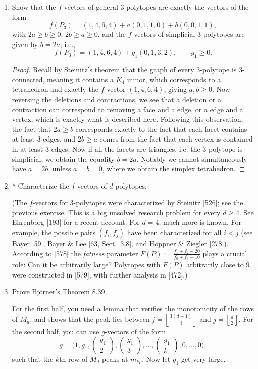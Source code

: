 \documentclass{article}
\begin{document}
\begin{enumerate}
\item Show that the $f$-vectors of general $3$-polytopes are exactly the vectors of the form
\[
f(P_3)=(1,4,6,4)+a(0,1,1,0)+b(0,0,1,1),
\]
with $2a\ge b\ge 0$, $2b\ge a\ge 0$, and the $f$-vectors of simplicial $3$-polytopes are given by $b=2a$, i.e.,
\[
f(P_3)=(1,4,6,4)+g_1(0,1,3,2),\qquad g_1\ge 0.
\]

\begin{proof}
Recall by Steinitz's theorem that the graph of every $3$-polytope is $3$-connected, meaning it contains a $K_4$ minor, which corresponds to a tetrahedron and exactly the $f$-vector $(1,4,6,4)$, giving $a,b \geq 0$. Now reversing the deletions and contractions, we see that a deletion or a contraction can correspond to removing a face and a edge, or a edge and a vertex, which is exactly what is described here. Following this observation, the fact that $2a \geq b$ corresponds exactly to the fact that each facet contains at least $3$ edges, and $2b \geq a$ comes from the fact that each vertex is contained in at least $3$ edges. Now if all the facets are triangles, i.e. the 3-polytope is simplicial, we obtain the equality $b=2a$. Notably we cannot simultaneously have $a=2b$, unless $a=b=0$, where we obtain the simplex tetrahedron. 
\end{proof}

\item* Characterize the $f$-vectors of $d$-polytopes.

(The $f$-vectors for $3$-polytopes were characterized by Steinitz [526]; see the previous exercise. This is a big unsolved research problem for every $d\ge 4$. See Ehrenborg [193] for a recent account. For $d=4$, much more is known. For example, the possible pairs $(f_i,f_j)$ have been characterized for all $i<j$ (see Bayer [59], Bayer \& Lee [63, Sect.~3.8], and H\"oppner \& Ziegler [278]). According to [578] the \emph{fatness} parameter $F(P):=\frac{f_1+f_2-20}{f_0+f_3-10}$ plays a crucial role: Can it be arbitrarily large? Polytopes with $F(P)$ arbitrarily close to $9$ were constructed in [579], with further analysis in [472].)

\item Prove Bj\"orner's Theorem 8.39. 

For the first half, you need a lemma that verifies the monotonicity of the rows of $M_d$, and shows that the peak lies between $j=\left\lfloor\frac{3(d-1)}{4}\right\rfloor$ and $j=\left\lfloor\frac{d}{2}\right\rfloor$. For the second half, you can use $g$-vectors of the form
\[
g=\bigl(1,g_1,\begin{pmatrix} g_1 \\ 2 \end{pmatrix},\begin{pmatrix} g_1 \\ 3 \end{pmatrix},\dots,\begin{pmatrix} g_1 \\ k \end{pmatrix},0,\dots,0\bigr),
\]
such that the $k$th row of $M_d$ peaks at $m_{kp}$. Now let $g_1$ get very large.


\end{enumerate}
\end{document}
